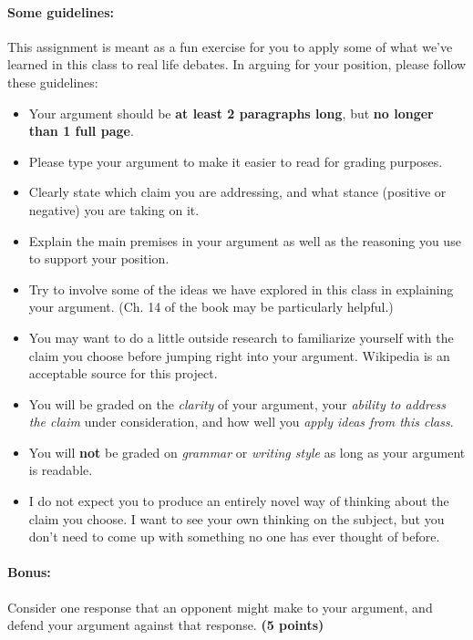 \documentclass[10pt]{article}
\begin{document}
\paragraph{Some guidelines:} This assignment is meant as a fun exercise for you to apply some of what we've learned in this class to real life debates.  In arguing for your position, please follow these guidelines:
\begin{itemize}
 \item Your argument should be \textbf{at least 2 paragraphs long}, but \textbf{no longer than 1 full page}.
 \item Please type your argument to make it easier to read for grading purposes.
 \item Clearly state which claim you are addressing, and what stance (positive or negative) you are taking on it.
 \item Explain the main premises in your argument as well as the reasoning you use to support your position.
 \item Try to involve some of the ideas we have explored in this class in explaining your argument. (Ch. 14 of the book may be particularly helpful.)
 \item You may want to do a little outside research to familiarize yourself with the claim you choose before jumping right into your argument.  Wikipedia is an acceptable source for this project.
 \item You will be graded on the \textit{clarity} of your argument, your \textit{ability to address the claim} under consideration, and how well you \textit{apply ideas from this class}.
 \item You will \textbf{not} be graded on \textit{grammar}  or \textit{writing style} as long as your argument is readable.
 \item I do not expect you to produce an entirely novel way of thinking about the claim you choose. I want to see your own thinking on the subject, but you don't need to come up with something no one has ever thought of before.
\end{itemize}


\paragraph{Bonus:}  Consider one response that an opponent might make to your argument, and defend your argument against that response. \textbf{(5 points)}
\end{document}
